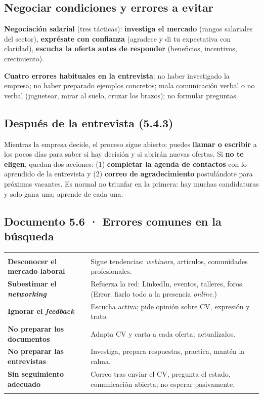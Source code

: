 \subsection*{Negociar condiciones y errores a evitar}
\textbf{Negociación salarial} (tres tácticas): \textbf{investiga el mercado} (rangos salariales del sector), \textbf{exprésate con confianza} (agradece y di tu expectativa con claridad), \textbf{escucha la oferta antes de responder} (beneficios, incentivos, crecimiento).

\textbf{Cuatro errores habituales en la entrevista}: no haber investigado la empresa; no haber preparado ejemplos concretos; mala comunicación verbal o no verbal (juguetear, mirar al suelo, cruzar los brazos); no formular preguntas.

\subsection{Después de la entrevista (5.4.3)}
Mientras la empresa decide, el proceso sigue abierto: puedes \textbf{llamar o escribir} a los pocos días para saber si hay decisión y si abrirán nuevas ofertas. Si \textbf{no te eligen}, quedan dos acciones: (1) \textbf{completar la agenda de contactos} con lo aprendido de la entrevista y (2) \textbf{correo de agradecimiento} postulándote para próximas vacantes. Es normal no triunfar en la primera: hay muchas candidaturas y solo gana una; aprende de cada una.

\subsection*{Documento 5.6 · Errores comunes en la búsqueda}
\begin{tabla}
\begin{tabularx}{\textwidth}{@{}>{\bfseries}p{3.6cm} Y@{}}
 &  \\
\midrule
Desconocer el mercado laboral & Sigue tendencias: \emph{webinars}, artículos, comunidades profesionales. \\
Subestimar el \emph{networking} & Refuerza la red: LinkedIn, eventos, talleres, foros. (Error: fiarlo todo a la presencia \emph{online}.) \\
Ignorar el \emph{feedback} & Escucha activa; pide opinión sobre CV, expresión y trato. \\
No preparar los documentos & Adapta CV y carta a cada oferta; actualízalos. \\
No preparar las entrevistas & Investiga, prepara respuestas, practica, mantén la calma. \\
Sin seguimiento adecuado & Correo tras enviar el CV, pregunta el estado, comunicación abierta; no esperar pasivamente. \\
\bottomrule
\end{tabularx}
\end{tabla}

